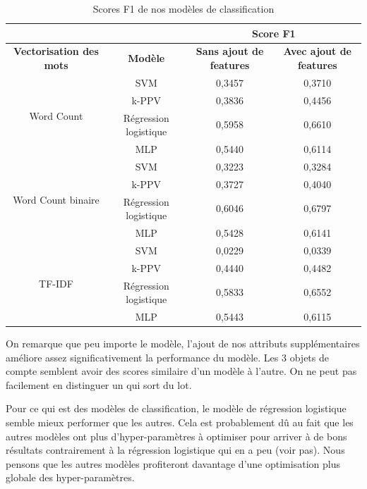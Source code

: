 \begin{longtable}[c]{cccc}
	\caption{Scores F1 de nos modèles de classification}
	\label{table:modeles_classification}\\
	\hline
	&                       & \multicolumn{2}{c}{\textbf{Score F1}}                             \\ 
	\endfirsthead
	\endhead
	\cline{2-4}
	\endfoot
	\endlastfoot
	\textbf{Vectorisation des mots}     & \textbf{Modèle}       & \textbf{Sans ajout de features} & \textbf{Avec ajout de features} \\ \hline
	\multirow{4}{*}{Word Count}         & SVM & 0,3457 & 0,3710 \\ 
	& k-PPV                 & 0,3836 & 0,4456 \\
	& Régression logistique & 0,5958 & 0,6610 \\
	& MLP                   & 0,5440 & 0,6114 \\ \hline
	\multirow{4}{*}{Word Count binaire} & SVM & 0,3223 & 0,3284 \\ 
	& k-PPV                 & 0,3727 & 0,4040 \\
	& Régression logistique & 0,6046 & 0,6797 \\
	& MLP                   & 0,5428 & 0,6141 \\ \hline
	\multirow{4}{*}{TF-IDF}             & SVM & 0,0229 & 0,0339 \\
	& k-PPV                 & 0,4440 & 0,4482 \\
	& Régression logistique & 0,5833 & 0,6552 \\
	& MLP                   & 0,5443 & 0,6115 \\ \hline
\end{longtable}

On remarque que peu importe le modèle, l'ajout de nos attributs supplémentaires améliore assez significativement la performance du modèle. Les 3 objets de compte semblent avoir des scores similaire d'un modèle à l'autre. On ne peut pas facilement en distinguer un qui sort du lot. 

Pour ce qui est des modèles de classification, le modèle de régression logistique semble mieux performer que les autres. Cela est probablement dû au fait que les autres modèles ont plus d'hyper-paramètres à optimiser pour arriver à de bons résultats contrairement à la régression logistique qui en a peu (voir pas). Nous pensons que les autres modèles profiteront davantage d'une optimisation plus globale des hyper-paramètres.